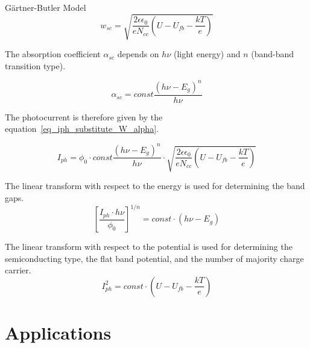 \documentclass[10pt,compress]{beamer}
\begin{document}
\begin{frame}[allowframebreaks=1.0]{Gärtner-Butler Model}
        \begin{equation}
            w_{sc} = \sqrt{ \frac{2\epsilon \epsilon _0}{e N_{cc}} (U-U_{fb}-\frac{kT}{e}) }
            \label{eq_space_charge_Schottky}
        \end{equation}
        
        The absorption coefficient $\alpha _{sc}$ depends on $h\nu$ (light energy) and $n$ (band-band transition type).

        \begin{equation}
            \alpha _{sc} = const \frac{(h\nu - E_g)^n}{h\nu}
            \label{eq_absorption_coef}
        \end{equation}

        \framebreak
        The photocurrent is therefore given by the 
        equation~\ref{eq_iph_substitute_W_alpha}. 

        \begin{equation}
            I_{ph} = \phi _0 \cdot const \frac{(h\nu - E_g)^n}{h\nu}
                \cdot \sqrt{ \frac{2\epsilon \epsilon _0}{e N_{cc}} (U-U_{fb}-\frac{kT}{e}) }
            \label{eq_iph_substitute_W_alpha}
        \end{equation}
        
        The linear transform with respect to the energy is used for determining the band gaps. 
        \begin{equation}
            \left[ \frac{I_{ph} \cdot h\nu}{\phi _0} \right] ^{1/n} = const \cdot (h\nu - E_g)
            \label{eq_iph_linear_transform}
        \end{equation}
        
        The linear transform with respect to the potential  is used for determining 
        the semiconducting type, the flat band potential, 
        and the number of majority charge carrier.
        \begin{equation}
            I_{ph}^2 = const \cdot (U-U_{fb}-\frac{kT}{e})
            \label{eq_iph_linear_transform_potential}
        \end{equation}
    \end{frame}



\section{Applications}
\end{document}
